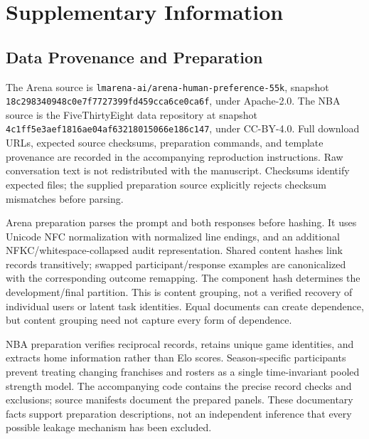 \documentclass{article}
\begin{document}
\clearpage



\clearpage
\appendix
\section{Supplementary Information}
\subsection{Data Provenance and Preparation}
The Arena source is \texttt{lmarena-ai/arena-human-preference-55k}, snapshot \texttt{18c298340948c0e7f7727399fd459cca6ce0ca6f}, under Apache-2.0. The NBA source is the FiveThirtyEight data repository at snapshot \texttt{4c1ff5e3aef1816ae04af63218015066e186c147}, under CC-BY-4.0. Full download URLs, expected source checksums, preparation commands, and template provenance are recorded in the accompanying reproduction instructions. Raw conversation text is not redistributed with the manuscript. Checksums identify expected files; the supplied preparation source explicitly rejects checksum mismatches before parsing.

Arena preparation parses the prompt and both responses before hashing. It uses Unicode NFC normalization with normalized line endings, and an additional NFKC/whitespace-collapsed audit representation. Shared content hashes link records transitively; swapped participant/response examples are canonicalized with the corresponding outcome remapping. The component hash determines the development/final partition. This is content grouping, not a verified recovery of individual users or latent task identities. Equal documents can create dependence, but content grouping need not capture every form of dependence.

NBA preparation verifies reciprocal records, retains unique game identities, and extracts home information rather than Elo scores. Season-specific participants prevent treating changing franchises and rosters as a single time-invariant pooled strength model. The accompanying code contains the precise record checks and exclusions; source manifests document the prepared panels. These documentary facts support preparation descriptions, not an independent inference that every possible leakage mechanism has been excluded.
\end{document}
